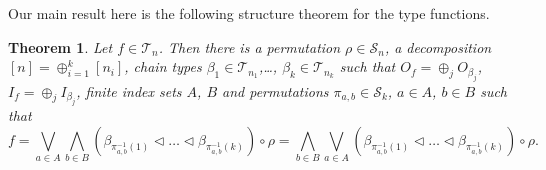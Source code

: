\documentclass[12pt]{article}
\newtheorem{theorem}{Theorem}
\theoremstyle{definition}
\theoremstyle{remark}
\def\Te{\mathcal T}
\def\permut{\mathscr{S}}
\def\vtl{\vartriangleleft}
\begin{document}
Our main result here is the  following structure theorem for the type functions.


\begin{theorem}\label{thm:structure}
Let  $f\in \Te_n$. Then there is a permutation $\rho\in \permut_n$, a decomposition
$[n]=\oplus_{i=1}^k[n_i]$, chain types 
$\beta_1\in \Te_{n_1}$,\dots, $\beta_k\in
\Te_{n_k}$ such that $O_f=\oplus_j O_{\beta_j}$, $I_f=\oplus_j I_{\beta_j}$, finite index sets $A$, $B$ and permutations $\pi_{a,b}\in
\permut_k$, $a\in A$, $b\in B$ such that 
\[
f=\bigvee_{a\in A}\bigwedge_{b\in B} (\beta_{\pi^{-1}_{a,b}(1)}\vtl \dots \vtl
\beta_{\pi^{-1}_{a,b}(k)})\circ \rho=\bigwedge_{b\in B}\bigvee_{a\in A}(\beta_{\pi^{-1}_{a,b}(1)}\vtl \dots \vtl
\beta_{\pi^{-1}_{a,b}(k)})\circ \rho.
\]
%
\end{theorem}
\end{document}
